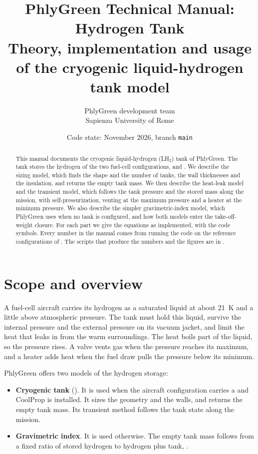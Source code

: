 \documentclass[a4paper,11pt]{article}
\title{PhlyGreen Technical Manual: Hydrogen Tank\\[4pt]
\large Theory, implementation and usage of the cryogenic liquid-hydrogen tank model}
\author{PhlyGreen development team\\Sapienza University of Rome}
\date{Code state: November 2026, branch \texttt{main}}
\begin{document}
\maketitle

\begin{abstract}
\noindent This manual documents the cryogenic liquid-hydrogen (LH$_2$) tank of PhlyGreen. The
tank stores the hydrogen of the two fuel-cell configurations,  and
. We describe the sizing model, which finds the shape and the number of
tanks, the wall thicknesses and the insulation, and returns the empty tank mass. We then describe
the heat-leak model and the transient model, which follows the tank pressure and the stored mass
along the mission, with self-pressurization, venting at the maximum pressure and a heater at the
minimum pressure. We also describe the simpler gravimetric-index model, which PhlyGreen uses when
no tank is configured, and how both models enter the take-off-weight closure. For each part we
give the equations as implemented, with the code symbols. Every number in the manual comes from
running the code on the reference configurations of . The scripts
that produce the numbers and the figures are in .
\end{abstract}

\tableofcontents
\newpage

\section{Scope and overview}\label{sec:scope}

A fuel-cell aircraft carries its hydrogen as a saturated liquid at about \SI{21}{K} and a little
above atmospheric pressure. The tank must hold this liquid, survive the internal pressure and
the external pressure on its vacuum jacket, and limit the heat that leaks in from the warm
surroundings. The heat boils part of the liquid, so the pressure rises. A valve vents gas when
the pressure reaches its maximum, and a heater adds heat when the fuel draw pulls the pressure
below its minimum.

PhlyGreen offers two models of the hydrogen storage:
\begin{itemize}
\item \textbf{Cryogenic tank} (). It is used when the aircraft configuration
  carries a  and CoolProp is installed. It sizes the geometry and the walls, and
  returns the empty tank mass. Its transient method  follows the tank state
  along the mission.
\item \textbf{Gravimetric index}. It is used otherwise. The empty tank mass follows from a fixed
  ratio of stored hydrogen to hydrogen plus tank, .
\end{itemize}
\end{document}
